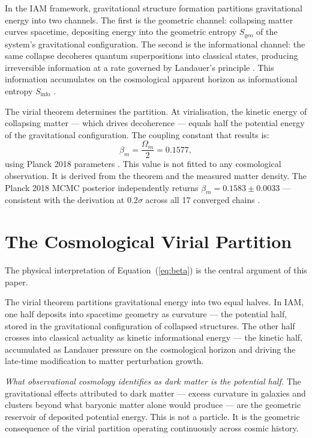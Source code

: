 \documentclass[12pt,a4paper]{article}
\begin{document}
In the IAM framework, gravitational structure formation partitions
gravitational energy into two channels. The first is the geometric channel:
collapsing matter curves spacetime, depositing energy into the geometric
entropy $S_\mathrm{geo}$ of the system's gravitational configuration. The
second is the informational channel: the same collapse decoheres quantum
superpositions into classical states, producing irreversible information at a
rate governed by Landauer's principle \citep{landauer1961}. This information
accumulates on the cosmological apparent horizon as informational entropy
$S_\mathrm{info}$ \citep{jacobson1995,cai2005}.

The virial theorem determines the partition. At virialisation, the kinetic
energy of collapsing matter --- which drives decoherence --- equals half the
potential energy of the gravitational configuration. The coupling constant that
results is:
\begin{equation}
  \beta_m = \frac{\Omega_m}{2} = 0.1577,
  \label{eq:beta}
\end{equation}
using Planck 2018 parameters \citep{planck2020}. This value is not fitted to
any cosmological observation. It is derived from the theorem and the measured
matter density. The Planck 2018 MCMC posterior independently returns
$\beta_m = 0.1583 \pm 0.0033$ --- consistent with the derivation at
$0.2\sigma$ across all 17 converged chains \citep{mahaffey2026}.

\section{The Cosmological Virial Partition}
\label{sec:partition}

The physical interpretation of Equation~(\ref{eq:beta}) is the central
argument of this paper.

The virial theorem partitions gravitational energy into two equal halves. In
IAM, one half deposits into spacetime geometry as curvature --- the potential
half, stored in the gravitational configuration of collapsed structures. The
other half crosses into classical actuality as kinetic informational energy ---
the kinetic half, accumulated as Landauer pressure on the cosmological horizon
and driving the late-time modification to matter perturbation growth.

\textit{What observational cosmology identifies as dark matter is the potential
half.} The gravitational effects attributed to dark matter --- excess curvature
in galaxies and clusters beyond what baryonic matter alone would produce ---
are the geometric reservoir of deposited potential energy. This is not a
particle. It is the geometric consequence of the virial partition operating
continuously across cosmic history.
\end{document}
